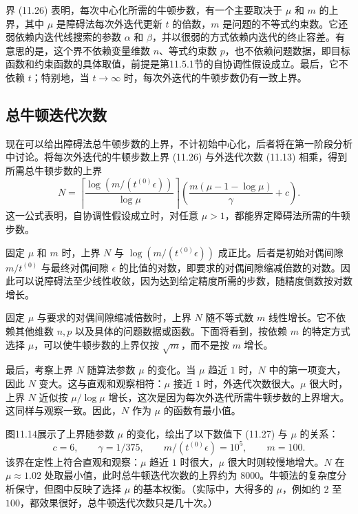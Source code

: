 界 (11.26) 表明，每次中心化所需的牛顿步数，有一个主要取决于 $\mu$ 和 $m$ 的上界，其中 $\mu$ 是障碍法每次外迭代更新 $t$ 的倍数，$m$ 是问题的不等式约束数。它还弱依赖内迭代线搜索的参数 $\alpha$ 和 $\beta$，并以很弱的方式依赖内迭代的终止容差。有意思的是，这个界不依赖变量维数 $n$、等式约束数 $p$，也不依赖问题数据，即目标函数和约束函数的具体取值，前提是第11.5.1节的自协调性假设成立。最后，它不依赖 $t$；特别地，当 $t\to\infty$ 时，每次外迭代的牛顿步数仍有一致上界。

\subsection{总牛顿迭代次数}
现在可以给出障碍法总牛顿步数的上界，不计初始中心化，后者将在第一阶段分析中讨论。将每次外迭代的牛顿步数上界 (11.26) 与外迭代次数 (11.13) 相乘，得到所需总牛顿步数的上界
\begin{equation}
N=\left\lceil\frac{\log(m/(t^{(0)}\epsilon))}{\log\mu}\right\rceil
\left(\frac{m(\mu-1-\log\mu)}{\gamma}+c\right).\tag{11.27}
\end{equation}
这一公式表明，自协调性假设成立时，对任意 $\mu>1$，都能界定障碍法所需的牛顿步数。

固定 $\mu$ 和 $m$ 时，上界 $N$ 与 $\log(m/(t^{(0)}\epsilon))$ 成正比。后者是初始对偶间隙 $m/t^{(0)}$ 与最终对偶间隙 $\epsilon$ 的比值的对数，即要求的对偶间隙缩减倍数的对数。因此可以说障碍法至少线性收敛，因为达到给定精度所需的步数，随精度倒数按对数增长。

固定 $\mu$ 与要求的对偶间隙缩减倍数时，上界 $N$ 随不等式数 $m$ 线性增长。它不依赖其他维数 $n,p$ 以及具体的问题数据或函数。下面将看到，按依赖 $m$ 的特定方式选择 $\mu$，可以使牛顿步数的上界仅按 $\sqrt m$，而不是按 $m$ 增长。

最后，考察上界 $N$ 随算法参数 $\mu$ 的变化。当 $\mu$ 趋近 $1$ 时，$N$ 中的第一项变大，因此 $N$ 变大。这与直观和观察相符：$\mu$ 接近 $1$ 时，外迭代次数很大。$\mu$ 很大时，上界 $N$ 近似按 $\mu/\log\mu$ 增长，这次是因为每次外迭代所需牛顿步数的上界增大。这同样与观察一致。因此，$N$ 作为 $\mu$ 的函数有最小值。

图11.14展示了上界随参数 $\mu$ 的变化，绘出了以下数值下 (11.27) 与 $\mu$ 的关系：
\[
c=6,\qquad\gamma=1/375,\qquad m/(t^{(0)}\epsilon)=10^5,\qquad m=100.
\]
该界在定性上符合直观和观察：$\mu$ 趋近 $1$ 时很大，$\mu$ 很大时则较慢地增大。$N$ 在 $\mu\approx1.02$ 处取最小值，此时总牛顿迭代次数的上界约为 $8000$。牛顿法的复杂度分析保守，但图中反映了选择 $\mu$ 的基本权衡。（实际中，大得多的 $\mu$，例如约 $2$ 至 $100$，都效果很好，总牛顿迭代次数只是几十次。）

